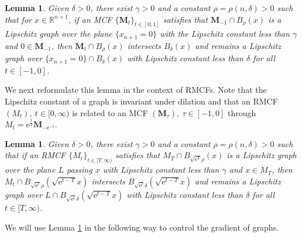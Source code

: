 \documentclass[12pt]{amsart}
\numberwithin{equation}{section}
\newtheorem{lemma}[theorem]{Lemma}
\numberwithin{equation}{section}
\newcommand{\R}{\mathbb{R}}
\begin{document}
	\begin{lemma}\label{LmPseudoMCF}
		Given $\delta>0$, there exist $\gamma>0$ and a constant $\rho=\rho(n,\delta)>0$ such that for $x\in\R^{n+1}$, if an MCF $\{\mathbf M_t\}_{t\in[0,1]}$ satisfies that $\mathbf M_{-1}\cap B_\rho(x)$ is a Lipschitz graph over the plane $\{x_{n+1}=0\}$ with the Lipschitz constant less than $\gamma$ and $0\in \mathbf M_{-1}$, then $\mathbf M_t\cap B_\rho(x)$ intersects $B_\delta(x)$ and remains a Lipschitz graph over $\{x_{n+1}=0\}\cap B_\delta(x)$ with Lipschitz constant less than $\delta$ for all $t\in[-1,0]$.
	\end{lemma}
	
	We next reformulate this lemma in the context of RMCFs. Note that the Lipschitz constant of a graph is invariant under dilation and that an RMCF $(M_t),\ t\in[0,\infty)$ is related to an MCF $(\mathbf M_{\tau}),\ \tau\in [-1,0]$ through ${M}_t=\mathrm{e}^{\frac{t}{2}}\mathbf M_{-\mathrm{e}^{-t}}$. 
	
	\begin{lemma}\label{LmPseudoRMCF}
		Given $\delta>0$, there exist $\gamma>0$ and a constant $\rho=\rho(n,\delta)>0$ such that if an RMCF $\{M_t\}_{t\in[T,\infty)}$ satisfies that $M_{T}\cap B_{\sqrt{\mathrm{e}^T}\rho}(x)$ is a Lipschitz graph over the plane $L$ passing $x$ with Lipschitz constant less than $\gamma$ and $x\in M_{T}$, then $M_t \cap B_{\sqrt{\mathrm{e}^t}\rho}(\sqrt{\mathrm{e}^{t-T}}x)$ intersects $B_{\sqrt{\mathrm{e}^t}\delta}(\sqrt{\mathrm{e}^{t-T}}x)$ and remains a Lipschitz graph over $L\cap B_{\sqrt{\mathrm{e}^t}\delta}(\sqrt{\mathrm{e}^{t-T}}x)$ with Lipschitz constant less than $\delta$ for all $t\in[T,\infty)$.
	\end{lemma}
	
	We will use Lemma \ref{LmPseudoRMCF} in the following way to control the gradient of graphs. 
	
\end{document}

